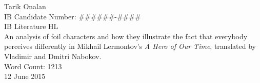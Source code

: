 \begin{titlepage}
    \vspace*{2.0cm}
    \begin{center}
        Tarik Onalan
        \\[0.4cm]
        IB Candidate Number: \#\#\#\#\#\#-\#\#\#\#
        \\[1.2cm]
        IB Literature HL
        \\\vspace*{\fill}
        An analysis of foil characters and how they illustrate the fact that everybody
        perceives differently in Mikhail Lermontov's \textit{A Hero of Our Time},
        translated by Vladimir and Dmitri Nabokov.
        \\\vspace*{\fill}
        Word Count: 1213
        \\[0.4cm]
        12 June 2015
    \end{center}
\end{titlepage}
